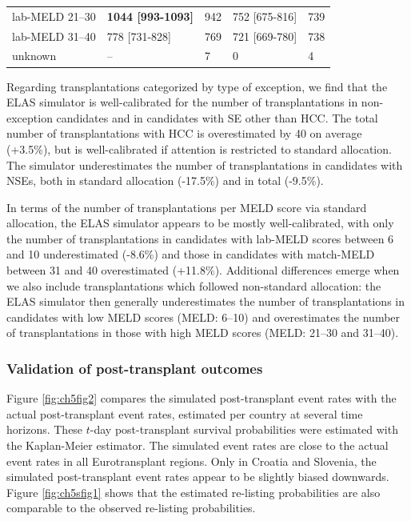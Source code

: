 \documentclass[11pt,twoside,]{book}
\begin{document}
\begin{table}[b]
{\begin{tabular}{L{3.4cm} R{3.9cm} L{.9cm} R{3.9cm} L{.9cm}}
\hspace{.7em}lab-MELD 21--30 & \textbf{1044   [993-1093]} & 942 & 752    [675-816] & 739\\
\hspace{.7em}lab-MELD 31--40 & 778    [731-828] & 769 & 721    [669-780] & 738\\
\hspace{.7em}unknown & -- & 7 & 0 & 4\\
\bottomrule
\end{tabular}
}
\end{table}

\endgroup

\FloatBarrier

Regarding transplantations categorized by type of exception,
we find that the
ELAS simulator is well-calibrated for the number of transplantations in
non-exception candidates and in candidates with SE other than HCC.
The total number of transplantations with HCC is overestimated by 40 on average
(+3.5\%), but is well-calibrated if attention is restricted to standard allocation. The simulator
underestimates the number of transplantations in candidates with NSEs,
both in standard allocation (-17.5\%) and in total (-9.5\%).

In terms of the number of transplantations per MELD score via standard allocation, the ELAS
simulator appears to be mostly well-calibrated, with
only the number of transplantations in candidates with lab-MELD scores between 6
and 10 underestimated (-8.6\%) and those in candidates with match-MELD between
31 and 40 overestimated (+11.8\%). Additional differences emerge when we also
include transplantations which followed non-standard allocation: the ELAS simulator
then generally underestimates the number of transplantations in candidates with low
MELD scores (MELD: 6--10) and overestimates the number of transplantations
in those with high MELD scores (MELD: 21--30 and 31--40).

\subsubsection{Validation of post-transplant outcomes}\label{sec:elasposttransplant}

Figure
\ref{fig:ch5fig2} compares the simulated
post-transplant event rates with the actual post-transplant event rates,
estimated per country at several time horizons. These \(t\)-day
post-transplant survival probabilities were estimated with the Kaplan-Meier
estimator. The simulated event rates are close to the actual event rates in all
Eurotransplant regions. Only in Croatia and Slovenia, the simulated
post-transplant event rates appear to be slightly biased downwards.
Figure \ref{fig:ch5sfig1} shows that the estimated re-listing
probabilities are also comparable to the observed re-listing probabilities.
\end{document}
